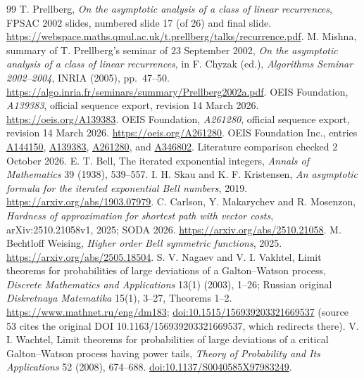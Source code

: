 \documentclass[11pt,letterpaper]{article}
\theoremstyle{remark}\newtheorem{remark}[theorem]{Remark}
\begin{document}
\begin{thebibliography}{99}
 T. Prellberg, \emph{On the asymptotic analysis of a class of linear recurrences}, FPSAC 2002 slides, numbered slide 17 (of 26) and final slide. \url{https://webspace.maths.qmul.ac.uk/t.prellberg/talks/recurrence.pdf}.
 M. Mishna, summary of T. Prellberg's seminar of 23 September 2002, \emph{On the asymptotic analysis of a class of linear recurrences}, in F. Chyzak (ed.), \emph{Algorithms Seminar 2002--2004}, INRIA (2005), pp.~47--50. \url{https://algo.inria.fr/seminars/summary/Prellberg2002a.pdf}.
 OEIS Foundation, \emph{A139383}, official sequence export, revision 14 March 2026. \url{https://oeis.org/A139383}.
 OEIS Foundation, \emph{A261280}, official sequence export, revision 14 March 2026. \url{https://oeis.org/A261280}.
 OEIS Foundation Inc., entries \href{https://oeis.org/A144150}{A144150}, \href{https://oeis.org/A139383}{A139383}, \href{https://oeis.org/A261280}{A261280}, and \href{https://oeis.org/A346802}{A346802}. Literature comparison checked 2 October 2026.
 E. T. Bell, The iterated exponential integers, \emph{Annals of Mathematics} 39 (1938), 539--557.
 I. H. Skau and K. F. Kristensen, \emph{An asymptotic formula for the iterated exponential Bell numbers}, 2019. \url{https://arxiv.org/abs/1903.07979}.
 C. Carlson, Y. Makarychev and R. Mosenzon, \emph{Hardness of approximation for shortest path with vector costs}, arXiv:2510.21058v1, 2025; SODA 2026. \url{https://arxiv.org/abs/2510.21058}.
 M. Bechtloff Weising, \emph{Higher order Bell symmetric functions}, 2025. \url{https://arxiv.org/abs/2505.18504}.
 S. V. Nagaev and V. I. Vakhtel, Limit theorems for probabilities of large deviations of a Galton--Watson process, \emph{Discrete Mathematics and Applications} 13(1) (2003), 1--26; Russian original \emph{Diskretnaya Matematika} 15(1), 3--27, Theorems 1--2. \url{https://www.mathnet.ru/eng/dm183}; \href{https://doi.org/10.1515/156939203321669537}{doi:10.1515/156939203321669537} (source 53 cites the original DOI 10.1163/156939203321669537, which redirects there).
 V. I. Wachtel, Limit theorems for probabilities of large deviations of a critical Galton--Watson process having power tails, \emph{Theory of Probability and Its Applications} 52 (2008), 674--688. \href{https://doi.org/10.1137/S0040585X97983249}{doi:10.1137/S0040585X97983249}.
\end{thebibliography}
\end{document}
